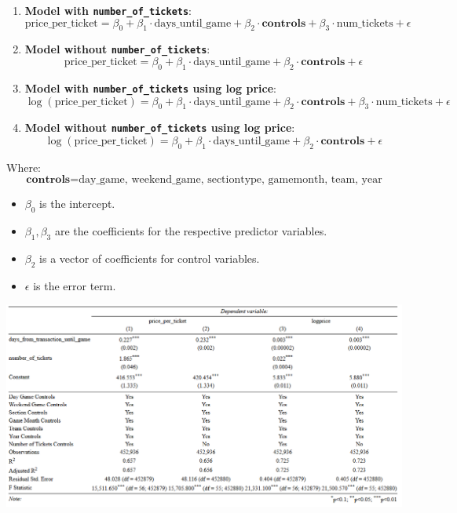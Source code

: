 \documentclass[
  12pt]{article}
\providecommand{\tightlist}{%
  \setlength{\itemsep}{0pt}\setlength{\parskip}{0pt}}\usepackage{longtable,booktabs,array}
\begin{document}
\begin{enumerate}
\def\labelenumi{\arabic{enumi}.}
\item
  \textbf{Model with \texttt{number\_of\_tickets}}: \[
  \text{price\_per\_ticket} = \beta_0 + \beta_1 \cdot \text{days\_until\_game} + \beta_2 \cdot \mathbf{\text{controls}}  
  + \beta_3 \cdot \text{num\_tickets} + \epsilon
  \]
\item
  \textbf{Model without \texttt{number\_of\_tickets}}: \[
  \text{price\_per\_ticket} = \beta_0 + \beta_1 \cdot \text{days\_until\_game} + \beta_2 \cdot \mathbf{\text{controls}} + \epsilon
  \]
\item
  \textbf{Model with \texttt{number\_of\_tickets} using log price}: \[
  \log(\text{price\_per\_ticket}) = \beta_0 + \beta_1 \cdot \text{days\_until\_game} + \beta_2 \cdot \mathbf{\text{controls}} + 
  \beta_3 \cdot \text{num\_tickets} + \epsilon
  \]
\item
  \textbf{Model without \texttt{number\_of\_tickets} using log price}:
  \[
  \log(\text{price\_per\_ticket}) = \beta_0 + \beta_1 \cdot \text{days\_until\_game} + \beta_2 \cdot \mathbf{\text{controls}} + \epsilon
  \]
\end{enumerate}

Where: \[
\mathbf{\text{controls}} = \text{day\_game, weekend\_game, sectiontype, gamemonth, team, year}
\]

\begin{itemize}
\tightlist
\item
  \(\beta_0\) is the intercept.
\item
  \(\beta_1, \beta_3\) are the coefficients for the respective predictor
  variables.
\item
  \(\beta_2\) is a vector of coefficients for control variables.
\item
  \(\epsilon\) is the error term.
\end{itemize}

\includegraphics{images/0.png}
\end{document}
